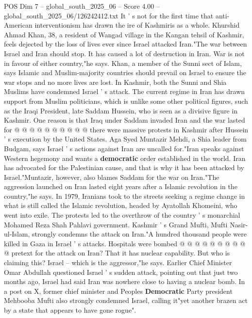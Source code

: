 \begin{textsample}{POS Dim 7 – global\_south\_2025\_06 – Score 4.00 – global\_south\_2025\_06/126242412.txt}  \label{ex:f7_pos_399}
It ' s not for the first time that anti-American interventionism has drawn the ire of Kashmiris as a whole.
Khurshid Ahmad Khan, 38, a resident of Wangad village in the Kangan tehsil of Kashmir, feels dejected by the loss of lives ever since Israel attacked Iran."The war between Israel and Iran should stop.
It has caused a lot of destruction in Iran.
War is not in favour of either country,"he says.
Khan, a member of the Sunni sect of Islam, says Islamic and Muslim-majority countries should prevail on Israel to ensure the war stops and no more lives are lost.
In Kashmir, both the Sunni and Shia Muslims have condemned Israel ' s attack.
The current regime in Iran has drawn support from Muslim politicians, which is unlike some other political figures, such as the Iraqi President, late Saddam Hussein, who is seen as a divisive figure in Kashmir.
One reason is that Iraq under Saddam invaded Iran and the war lasted for @ @ @ @ @ @ @ @ @ @ there were massive protests in Kashmir after Hussein ' s execution by the United States.
Aga Syed Muntazir Mehdi, a Shia leader from Budgam, says Israel ' s actions against Iran are uncalled for."Iran speaks against Western hegemony and wants a \textbf{democratic} order established in the world.
Iran has advocated for the Palestinian cause, and that is why it has been attacked by Israel."Muntazir, however, also blames Saddam for the war on Iran."The aggression launched on Iran lasted eight years after a Islamic revolution in the country,"he says.
In 1979, Iranians took to the streets seeking a regime change in what is still called the Islamic revolution, headed by Ayatollah Khomeini, who went into exile.
The protests led to the overthrow of the country ' s monarchial Mohamed Reza Shah Pahlavi government.
Kashmir ' s Grand Mufti, Mufti Nasir-ul-Islam, strongly condemns the attack on Iran."A hundred thousand people were killed in Gaza in Israel ' s attacks.
Hospitals were bombed @ @ @ @ @ @ @ @ @ @ pretext for the attack on Iran?
That it has nuclear capability.
But who is claiming this?
Israel -- which is the aggressor,"he says.
Earlier Chief Minister Omar Abdullah questioned Israel ' s sudden attack, pointing out that just two months ago, Israel had said Iran was nowhere close to having a nuclear bomb.
In a post on X, former chief minister and Peoples \textbf{Democratic} Party president Mehbooba Mufti also strongly condemned Israel, calling it"yet another brazen act by a state that appears to have gone rogue".

\end{textsample}
